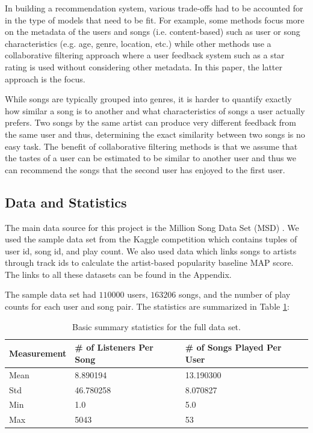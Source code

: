 \documentclass[11pt,preprint]{aastex}
\begin{document}
In building a recommendation system, various trade-offs had to be accounted for in the type of models that need to be fit. For example, some methods focus more on the metadata of the users and songs (i.e. content-based) such as user or song characteristics (e.g. age, genre, location, etc.) while other methods use a collaborative filtering approach where a user feedback system such as a star rating is used without considering other metadata. In this paper, the latter approach is the focus.

While songs are typically grouped into genres, it is harder to quantify exactly how similar a song is to another and what characteristics of songs a user actually prefers. Two songs by the same artist can produce very different feedback from the same user and thus, determining the exact similarity between two songs is no easy task. The benefit of collaborative filtering methods is that we assume that the tastes of a user can be estimated to be similar to another user and thus we can recommend the songs that the second user has enjoyed to the first user.

\subsection{Data and Statistics}
The main data source for this project is the Million Song Data Set (MSD)  \citep{Bertin-Mahieux2011}. We used the sample data set from the Kaggle competition which contains tuples of user id, song id, and play count. We also used data which links songs to artists through track ids to calculate the artist-based popularity baseline MAP score. The links to all these datasets can be found in the Appendix.

The sample data set had $110000$ users, $163206$ songs, and the number of play counts for each user and song pair. The statistics are summarized in Table \ref{tab:stats}:

\begin{table}[h]
\begin{center}
\begin{tabular}{lll}
\hline
Measurement & \# of Listeners Per Song & \# of Songs Played Per User \\
\hline
Mean  &     8.890194 & 13.190300  \\
Std      &    46.780258 & 8.070827 \\
Min      &    1.0  & 5.0  \\
Max     &   5043 &  53 \\
\end{tabular}
\caption{Basic summary statistics for the full data set.}\label{tab:stats}
\end{center}
\end{table}
\end{document}
